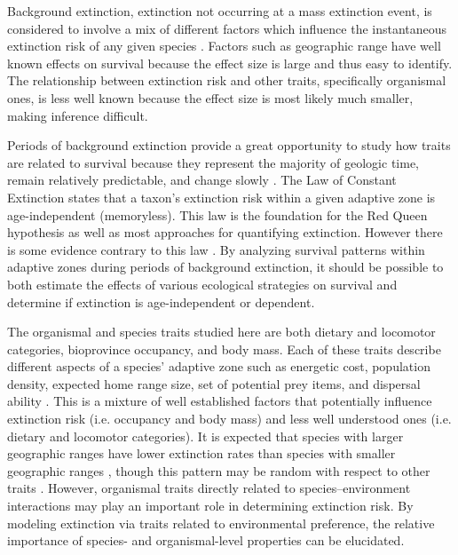 \documentclass[12pt,letterpaper]{article}
\begin{document}
Background extinction, extinction not occurring at a mass extinction event, is considered to involve a mix of different factors which influence the instantaneous extinction risk of any given species \citep{Jablonski1986,Wang2003,Harnik2013,Kitchell1986,Nurnberg2013a,Payne2007}. Factors such as geographic range have well known effects on survival \citep{Payne2007,Jablonski1987} because the effect size is large and thus easy to identify. The relationship between extinction risk and other traits, specifically organismal ones, is less well known because the effect size is most likely much smaller, making inference difficult.

Periods of background extinction provide a great opportunity to study how traits are related to survival because they represent the majority of geologic time, remain relatively predictable, and change slowly \citep{Jablonski1986,Raup1988}. The Law of Constant Extinction \citep{VanValen1973} states that a taxon's extinction risk within a given adaptive zone is age-independent (memoryless). This law is the foundation for the Red Queen hypothesis as well as most approaches for quantifying extinction. However there is some evidence contrary to this law \citep{Drake2014,Raup1975,Sepkoski1975,Finnegan2008}. By analyzing survival patterns within adaptive zones during periods of background extinction, it should be possible to both estimate the effects of various ecological strategies on survival and determine if extinction is age-independent or dependent. 

The organismal and species traits studied here are both dietary and locomotor categories, bioprovince occupancy, and body mass. Each of these traits describe different aspects of a species' adaptive zone such as energetic cost, population density, expected home range size, set of potential prey items, and dispersal ability \citep{Smith2004,Smith2008b,Damuth1981a,Damuth1979,Jernvall2004,Lyons2005,Lyons2010}. This is a mixture of well established factors that potentially influence extinction risk (i.e. occupancy and body mass) and less well understood ones (i.e. dietary and locomotor categories). It is expected that species with larger geographic ranges have lower extinction rates than species with smaller geographic ranges \citep{Jablonski1986,Harnik2013,Nurnberg2013a,Jablonski2003,Roy2009c}, though this pattern may be random with respect to other traits \citep{Raup1991b}. However, organismal traits directly related to species--environment interactions may play an important role in determining extinction risk. By modeling extinction via traits related to environmental preference, the relative importance of species- and organismal-level properties can be elucidated. 
\end{document}
